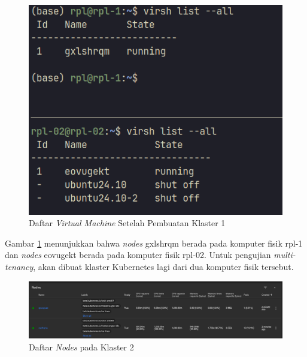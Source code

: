 \begin{figure}[H]
  \centering
  \includegraphics[scale=0.3]{gambar/ssh-nodes-list-1.png}
  \caption{Daftar \emph{Virtual Machine} Setelah Pembuatan Klaster 1}
  \label{fig:vm-komputer-fisik-1}
\end{figure}

Gambar \ref{fig:vm-komputer-fisik-1} menunjukkan bahwa \emph{nodes} gxlshrqm berada
pada komputer fisik rpl-1 dan \emph{nodes} eovugekt berada pada
komputer fisik rpl-02. Untuk pengujian \emph{multi-tenancy}, akan
dibuat klaster Kubernetes lagi dari dua komputer fisik tersebut.

\begin{figure}[H]
  \centering
  \includegraphics[scale=0.3]{gambar/two-nodes-difference-computer-dashboard-2.png}
  \caption{Daftar \emph{Nodes} pada Klaster 2}
  \label{fig:nodes-2-komputer-berbeda-2}
\end{figure}

